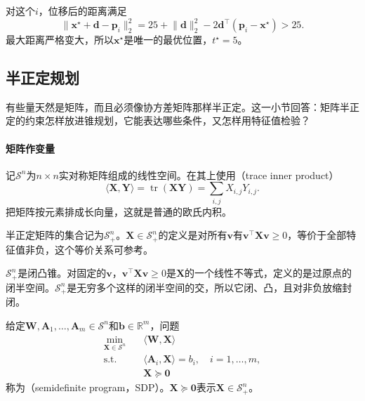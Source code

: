 对这个$i$，位移后的距离满足
\[
 \lVert\bm{x}^\star+\bm{d}-\bm{p}_i\rVert_2^2=25+\lVert\bm{d}\rVert_2^2-2\bm{d}^\top(\bm{p}_i-\bm{x}^\star)>25.
\]
最大距离严格变大，所以$\bm{x}^\star$是唯一的最优位置，$t^\star=5$。

\subsection{半正定规划}
\label{sec:cone-sdp}

有些量天然是矩阵，而且必须像协方差矩阵那样半正定。这一小节回答：矩阵半正定的约束怎样放进锥规划，它能表达哪些条件，又怎样用特征值检验？

\paragraph{矩阵作变量}
记$\mathcal{S}^n$为$n\times n$实对称矩阵组成的线性空间。在其上使用（trace inner product）
\begin{equation}
 \langle\bm{X},\bm{Y}\rangle=\operatorname{tr}(\bm{X}\bm{Y})=\sum_{i,j}X_{i,j}Y_{i,j}.
 \label{eq:cone-trace-inner}
\end{equation}
把矩阵按元素排成长向量，这就是普通的欧氏内积。

半正定矩阵的集合记为$\mathcal{S}^n_+$。$\bm{X}\in\mathcal{S}^n_+$的定义是对所有$\bm{v}$有$\bm{v}^\top\bm{X}\bm{v}\geq0$，等价于全部特征值非负，这个等价关系可参考。

$\mathcal{S}^n_+$是闭凸锥。对固定的$\bm{v}$，$\bm{v}^\top\bm{X}\bm{v}\geq0$是$\bm{X}$的一个线性不等式，定义的是过原点的闭半空间。$\mathcal{S}^n_+$是无穷多个这样的闭半空间的交，所以它闭、凸，且对非负放缩封闭。

\begin{definition}[半正定规划]
\label{def:cone-sdp}
给定$\bm{W},\bm{A}_1,\ldots,\bm{A}_m\in\mathcal{S}^n$和$\bm{b}\in\mathbb{R}^m$，问题
\begin{equation}
 \begin{aligned}
 \min_{\bm{X}\in\mathcal{S}^n}\quad&\langle\bm{W},\bm{X}\rangle\\
 \text{s.t.}\quad&\langle\bm{A}_i,\bm{X}\rangle=b_i,\quad i=1,\ldots,m,\\
 &\bm{X}\succeq\bm{0}
 \end{aligned}
 \label{eq:cone-sdp}
\end{equation}
称为（semidefinite program，SDP）。$\bm{X}\succeq\bm{0}$表示$\bm{X}\in\mathcal{S}^n_+$。
\end{definition}

